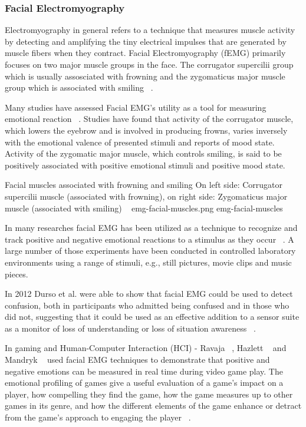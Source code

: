 \subsubsection{Facial Electromyography}

Electromyography in general refers to a technique that measures muscle activity by detecting and amplifying the tiny electrical impulses that are generated by muscle fibers when they contract. Facial Electromyography (fEMG) primarily focuses on two major muscle groups in the face. The corrugator supercilii group which is usually assosciated with frowning and the zygomaticus major muscle group which is associated with smiling ~\cite{larsen2003effects, sato2008enhanced}.

Many studies have assessed Facial EMG's utility as a tool for measuring emotional reaction ~\cite{dimberg1990facial}. Studies have found that activity of the corrugator muscle, which lowers the eyebrow and is involved in producing frowns, varies inversely with the emotional valence of presented stimuli and reports of mood state. Activity of the zygomatic major muscle, which controls smiling, is said to be positively associated with positive emotional stimuli and positive mood state.

\img
{Facial muscles associated with frowning and smiling}
{On left side: Corrugator supercilii muscle (associated with frowning), on right side: Zygomaticus major muscle (associated with smiling) ~\cite{wiki2014facial}}
{emg-facial-muscles.png}
{emg-facial-muscles}

In many researches facial EMG has been utilized as a technique to recognize and track positive and negative emotional reactions to a stimulus as they occur ~\cite{wolf2005facial}. A large number of those experiments have been conducted in controlled laboratory environments using a range of stimuli, e.g., still pictures, movie clips and music pieces.

In 2012 Durso et al. were able to show that facial EMG could be used to detect confusion, both in participants who admitted being confused and in those who did not, suggesting that it could be used as an effective addition to a sensor suite as a monitor of loss of understanding or loss of situation awareness ~\cite{durso2012detecting}.

In gaming and Human-Computer Interaction (HCI) - Ravaja ~\cite{ravaja2008psychophysiology}, Hazlett ~\cite{hazlett2006measuring} and Mandryk ~\cite{mandryk2007fuzzy} used facial EMG techniques to demonstrate that positive and negative emotions can be measured in real time during video game play. The emotional profiling of games give a useful evaluation of a game's impact on a player, how compelling they find the game, how the game measures up to other games in its genre, and how the different elements of the game enhance or detract from the game's approach to engaging the player ~\cite{nacke2010affective}.

